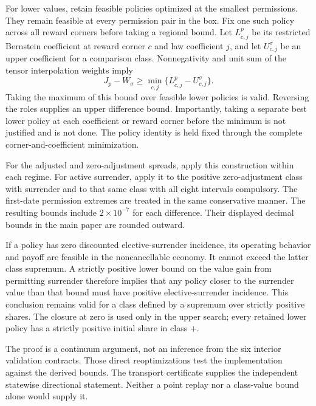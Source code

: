 For lower values, retain feasible policies optimized at the smallest permissions. They remain feasible at every permission pair in the box. Fix one such policy across all reward corners before taking a regional bound. Let $L^{p}_{c,j}$ be its restricted Bernstein coefficient at reward corner $c$ and law coefficient $j$, and let $U^\sigma_{c,j}$ be an upper coefficient for a comparison class. Nonnegativity and unit sum of the tensor interpolation weights imply
\[
 J_p-W_\sigma\geq\min_{c,j}\{L^p_{c,j}-U^\sigma_{c,j}\}.
\]
Taking the maximum of this bound over feasible lower policies is valid. Reversing the roles supplies an upper difference bound. Importantly, taking a separate best lower policy at each coefficient or reward corner before the minimum is not justified and is not done. The policy identity is held fixed through the complete corner-and-coefficient minimization.

For the adjusted and zero-adjustment spreads, apply this construction within each regime. For active surrender, apply it to the positive zero-adjustment class with surrender and to that same class with all eight intervals compulsory. The first-date permission extremes are treated in the same conservative manner. The resulting bounds include $2\times10^{-7}$ for each difference. Their displayed decimal bounds in the main paper are rounded outward.

If a policy has zero discounted elective-surrender incidence, its operating behavior and payoff are feasible in the noncancellable economy. It cannot exceed the latter class supremum. A strictly positive lower bound on the value gain from permitting surrender therefore implies that any policy closer to the surrender value than that bound must have positive elective-surrender incidence. This conclusion remains valid for a class defined by a supremum over strictly positive shares. The closure at zero is used only in the upper search; every retained lower policy has a strictly positive initial share in class $+$.

The proof is a continuum argument, not an inference from the six interior validation contracts. Those direct reoptimizations test the implementation against the derived bounds. The transport certificate supplies the independent statewise directional statement. Neither a point replay nor a class-value bound alone would supply it.

